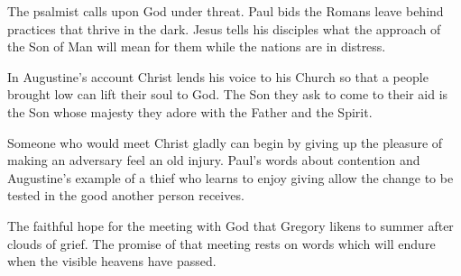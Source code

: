 \begin{fourSenses}
\item[Literal.] The psalmist calls upon God under threat. Paul bids the Romans leave behind practices that thrive in the dark. Jesus tells his disciples what the approach of the Son of Man will mean for them while the nations are in distress.
\item[Allegorical.] In Augustine's account Christ lends his voice to his Church so that a people brought low can lift their soul to God. The Son they ask to come to their aid is the Son whose majesty they adore with the Father and the Spirit.
\item[Moral.] Someone who would meet Christ gladly can begin by giving up the pleasure of making an adversary feel an old injury. Paul's words about contention and Augustine's example of a thief who learns to enjoy giving allow the change to be tested in the good another person receives.
\item[Anagogical.] The faithful hope for the meeting with God that Gregory likens to summer after clouds of grief. The promise of that meeting rests on words which will endure when the visible heavens have passed.
\end{fourSenses}
